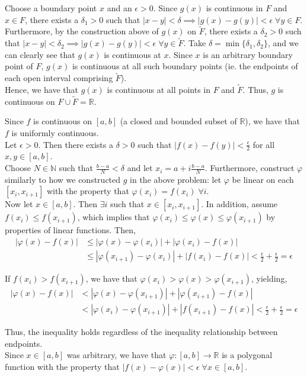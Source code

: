 \documentclass[12pt]{article}
\newenvironment{problem}[2][Problem]{\begin{trivlist}
\item[\hskip \labelsep {\bfseries #1}\hskip \labelsep {\bfseries #2.}]}{\end{trivlist}}
\begin{document}
Choose a boundary point $x$ and an $\epsilon > 0$. Since $g(x)$ is continuous in $F$ and $x \in F$, there exists a $\delta_1 > 0$ such that $|x - y| < \delta \implies |g(x) - g(y)| < \epsilon \; \forall y \in F$. Furthermore, by the construction above of $g(x)$ on $\tilde{F}$, there exists a $\delta_2 > 0$ such that $|x - y| < \delta_2 \implies |g(x) - g(y)| < \epsilon \; \forall y \in \tilde{F}$. Take $\delta = \min\{\delta_1, \delta_2\}$, and we can clearly see that $g(x)$ is continuous at $x$. Since $x$ is an arbitrary boundary point of $F$, $g(x)$ is continuous at all such boundary points (ie. the endpoints of each open interval comprising $\tilde{F}$).\\

Hence, we have that $g(x)$ is continuous at all points in $F$ and $\tilde{F}$. Thus, $g$ is continuous on $F \cup \tilde{F} = \mathbb{R}$.

\begin{problem}{4}
\end{problem}

Since $f$ is continuous on $[a, b]$ (a closed and bounded subset of $\mathbb{R}$), we have that $f$ is uniformly continuous.\\

Let $\epsilon > 0$. Then there exists a $\delta > 0$ such that $|f(x) - f(y)| < \frac{\epsilon}{2}$ for all $x, y \in [a, b]$.\\

Choose $N \in \mathbb{N}$ such that $\frac{b-a}{N} < \delta$ and let $x_i = a + i\frac{b-a}{N}$. Furthermore, construct $\varphi$ similarly to how we constructed $g$ in the above problem: let $\varphi$ be linear on each $[x_i, x_{i+1}]$ with the property that $\varphi(x_i) = f(x_i) \; \forall i$.\\

Now let $x \in [a, b]$. Then $\exists i$ such that $x \in [x_i, x_{i+1}]$. In addition, assume $f(x_i) \leq f(x_{i+1})$, which implies that $\varphi(x_i) \leq \varphi(x) \leq \varphi(x_{i+1})$ by properties of linear functions. Then,
\begin{align*}
|\varphi(x) - f(x)| &\leq |\varphi(x) - \varphi(x_i)| + |\varphi(x_i) - f(x)|\\
&\leq |\varphi(x_{i+1}) - \varphi(x_i)| + |f(x_i) - f(x)| < \frac{\epsilon}{2} + \frac{\epsilon}{2} = \epsilon
\end{align*}

If $f(x_i) > f(x_{i+1})$, we have that $\varphi(x_i) > \varphi(x) > \varphi(x_{i+1})$, yielding,
\begin{align*}
|\varphi(x) - f(x)| &< |\varphi(x) - \varphi(x_{i+1})| + |\varphi(x_{i+1}) - f(x)|\\
&< |\varphi(x_i) - \varphi(x_{i+1})| + |f(x_{i+1}) - f(x)| < \frac{\epsilon}{2} + \frac{\epsilon}{2} = \epsilon
\end{align*}

Thus, the inequality holds regardless of the inequality relationship between endpoints.\\

Since $x \in [a, b]$ was arbitrary, we have that $\varphi: [a,b] \to \mathbb{R}$ is a polygonal function with the property that $|f(x) - \varphi(x)| < \epsilon \; \forall x \in [a, b]$.
\end{document}
